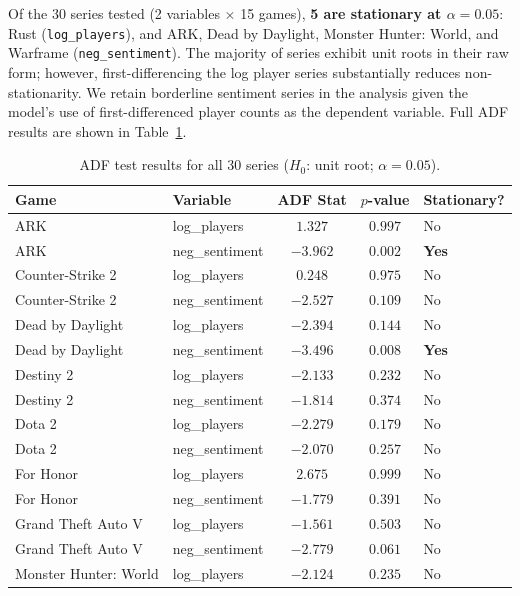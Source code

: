 \documentclass[11pt, letterpaper]{article}
\begin{document}
Of the 30 series tested (2 variables $\times$ 15 games), \textbf{5 are stationary at $\alpha = 0.05$}: Rust (\texttt{log\_players}), and ARK, Dead by Daylight, Monster Hunter: World, and Warframe (\texttt{neg\_sentiment}).
The majority of series exhibit unit roots in their raw form; however, first-differencing the log player series substantially reduces non-stationarity.
We retain borderline sentiment series in the analysis given the model's use of first-differenced player counts as the dependent variable.
Full ADF results are shown in Table~\ref{tab:adf}.

\begin{table}[H]
\centering
\small
\caption{ADF test results for all 30 series ($H_0$: unit root; $\alpha = 0.05$).}
\label{tab:adf}
\begin{tabular}{llccl}
\toprule
\textbf{Game} & \textbf{Variable} & \textbf{ADF Stat} & $p$\textbf{-value} & \textbf{Stationary?} \\
\midrule
ARK                   & log\_players   & $1.327$  & $0.997$ & No \\
ARK                   & neg\_sentiment & $-3.962$ & $0.002$ & \textbf{Yes} \\
Counter-Strike 2      & log\_players   & $0.248$  & $0.975$ & No \\
Counter-Strike 2      & neg\_sentiment & $-2.527$ & $0.109$ & No \\
Dead by Daylight      & log\_players   & $-2.394$ & $0.144$ & No \\
Dead by Daylight      & neg\_sentiment & $-3.496$ & $0.008$ & \textbf{Yes} \\
Destiny 2             & log\_players   & $-2.133$ & $0.232$ & No \\
Destiny 2             & neg\_sentiment & $-1.814$ & $0.374$ & No \\
Dota 2                & log\_players   & $-2.279$ & $0.179$ & No \\
Dota 2                & neg\_sentiment & $-2.070$ & $0.257$ & No \\
For Honor             & log\_players   & $2.675$  & $0.999$ & No \\
For Honor             & neg\_sentiment & $-1.779$ & $0.391$ & No \\
Grand Theft Auto V    & log\_players   & $-1.561$ & $0.503$ & No \\
Grand Theft Auto V    & neg\_sentiment & $-2.779$ & $0.061$ & No \\
Monster Hunter: World & log\_players   & $-2.124$ & $0.235$ & No \\

\end{tabular}
\end{table}
\end{document}
